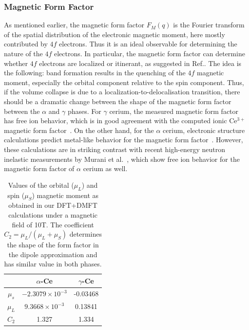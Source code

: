 \documentclass[10pt]{ruthesis}
\begin{document}
{\subsubsection{Magnetic Form Factor}
As mentioned earlier, the magnetic form factor $F_M(q)$ is the
Fourier transform of the spatial distribution of the electronic
magnetic moment, here mostly contributed by $4f$ electrons. Thus it is
an ideal observable for determining the nature of the $4f$ electrons.
In particular, the magnetic form factor can determine whether $4f$
electrons are localized or itinerant, as suggested in
Ref.\cite{hjelm1994}. The idea is the following: band formation
results in the quenching of the $4f$ magnetic moment, especially the
orbital component relative to the spin component. Thus, if the volume
collapse is due to a localization-to-delocalisation transition, there
should be a dramatic change between the shape of the magnetic form
factor between the $\alpha$ and $\gamma$ phases.  For $\gamma$ cerium,
the measured magnetic form factor has free ion behavior, which is in
good agreement with the computed ionic Ce$^{3+}$ magnetic form
factor~\cite{stassis}.  On the other hand, for the $\alpha$ cerium,
electronic structure calculations predict metal-like behavior for the
magnetic form factor~\cite{hjelm1994}.  However, these calculations
are in striking contrast with recent high-energy neutron inelastic
measurements by Murani et al.~\cite{murani}, which show free ion
behavior for the magnetic form factor of $\alpha$ cerium as well.


%

\begin{table}[H]
\begin{center}
\begin{tabular}{|c|c|c|}
\hline 
 & $\alpha$-Ce & $\gamma$-Ce \\
 \hline
$\mu_s$ & $-2.3079\times10^{-3}$ & -0.03468 \\
$\mu_L$ & $9.3668\times10^{-3}$ & 0.13841\\
$C_2$ & 1.327 & 1.334 \\
\hline
\end{tabular}
\caption{
Values of the orbital ($\mu_L$) and spin ($\mu_S$) magnetic moment as
obtained in our DFT+DMFT calculations under a magnetic field of 10T. The coefficient
$C_2=\mu_L/(\mu_L + \mu_S)$ determines the shape of the form factor in
the dipole approximation and has similar value in both phases.
%
}
\label{table1_Ce}
\end{center}
\end{table}

}
\end{document}
